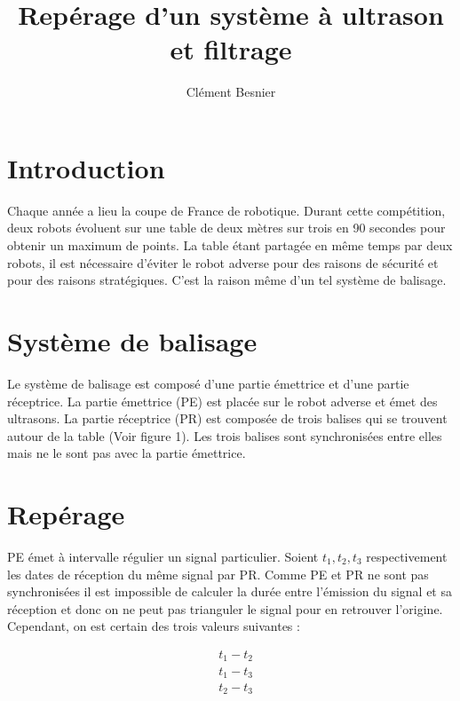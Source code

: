 \documentclass[a4paper, 8pt]{article}
\title{Repérage d'un système à ultrason et filtrage}
\author{Clément Besnier}
\begin{document}
\maketitle
\section{Introduction}

Chaque année a lieu la coupe de France de robotique. Durant cette compétition, deux robots évoluent sur une table de deux mètres sur trois en 90 secondes pour obtenir un maximum de points. La table étant partagée en même temps par deux robots, il est nécessaire d'éviter le robot adverse pour des raisons de sécurité et pour des raisons stratégiques. C'est la raison même d'un tel système de balisage.



\section{Système de balisage}

Le système de balisage est composé d'une partie émettrice et d'une partie réceptrice. La partie émettrice (PE) est placée sur le robot adverse et émet des ultrasons. La partie réceptrice (PR) est composée de trois balises qui se trouvent autour de la table (Voir figure 1). Les trois balises sont synchronisées entre elles mais ne le sont pas avec la partie émettrice. 

\section{Repérage}

PE émet à intervalle régulier un signal particulier. Soient $ t_{1}, t_{2}, t_{3}$  respectivement les dates de réception du même signal par PR. Comme PE et PR ne sont pas synchronisées il est impossible de calculer la durée entre l'émission du signal et sa réception et donc on ne peut pas trianguler le signal pour en retrouver l'origine. Cependant, on est certain des trois valeurs suivantes : 


\begin{equation}\label{1}
		\begin{split}
		& t_{1} - t_{2}\\
		& t_{1} - t_{3}\\
		& t_{2} - t_{3}
		\end{split}
\end{equation}
\end{document}

